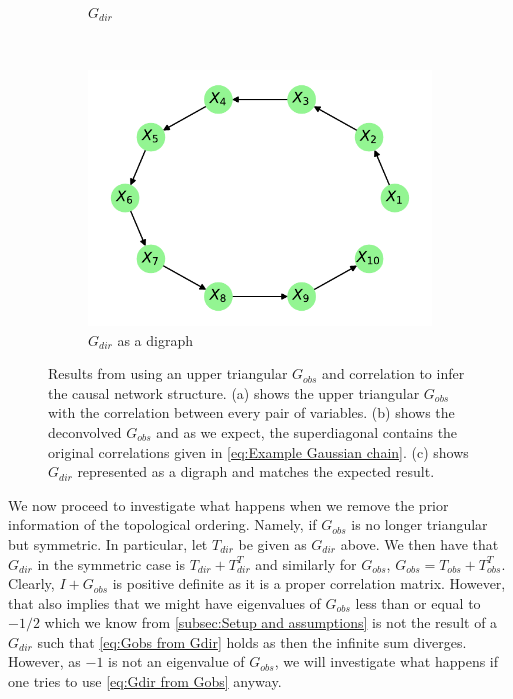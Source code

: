 \documentclass[../Thesis.tex]{subfiles}
\begin{document}
\begin{figure}[H]
\begin{subfigure}[t]{0.49\textwidth}
        \caption{$G_{dir}$}
        \label{subfig:Gaussian chain triangular G_obs using correlation - G_dir}
    \end{subfigure}
    \\[\baselineskip]
    \begin{subfigure}[t]{0.49\textwidth}
        \centering
        \includegraphics[width=.9\linewidth]{figures/Gaussian Chain Theoretical/Chain graph from triangular G obs.pdf}
        \caption{$G_{dir}$ as a digraph}
    \end{subfigure}
    \caption{Results from using an upper triangular $G_{obs}$ and correlation to infer the causal network structure. (a) shows the upper triangular $G_{obs}$ with the correlation between every pair of variables. (b) shows the deconvolved $G_{obs}$ and as we expect, the superdiagonal contains the original correlations given in \autoref{eq:Example Gaussian chain}. (c) shows $G_{dir}$ represented as a digraph and matches the expected result.}
    \label{fig:Gaussian chain triangular G_obs using correlation}
\end{figure}
We now proceed to investigate what happens when we remove the prior information of the topological ordering. Namely, if $G_{obs}$ is no longer triangular but symmetric. In particular, let $T_{dir}$ be given as $G_{dir}$ above. We then have that $G_{dir}$ in the symmetric case is $T_{dir} + T_{dir}^T$ and similarly for $G_{obs}$, $G_{obs} = T_{obs} + T_{obs}^T$. Clearly, $I + G_{obs}$ is positive definite as it is a proper correlation matrix. However, that also implies that we might have eigenvalues of $G_{obs}$ less than or equal to $-1/2$ which we know from \autoref{subsec:Setup and assumptions} is not the result of a $G_{dir}$ such that \autoref{eq:Gobs from Gdir} holds as then the infinite sum diverges. However, as $-1$ is not an eigenvalue of $G_{obs}$, we will investigate what happens if one tries to use \autoref{eq:Gdir from Gobs} anyway.
\end{document}
